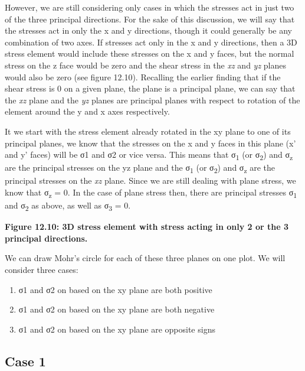 \documentclass[
  letterpaper,
  DIV=11,
  numbers=noendperiod]{scrreprt}
\begin{document}
However, we are still considering only cases in which the stresses act
in just two of the three principal directions. For the sake of this
discussion, we will say that the stresses act in only the x and y
directions, though it could generally be any combination of two axes. If
stresses act only in the x and y directions, then a 3D stress element
would include these stresses on the x and y faces, but the normal stress
on the z face would be zero and the shear stress in the \emph{xz} and
\emph{yz} planes would also be zero (see figure 12.10). Recalling the
earlier finding that if the shear stress is 0 on a given plane, the
plane is a principal plane, we can say that the \emph{xz} plane and the
\emph{yz} planes are principal planes with respect to rotation of the
element around the y and x axes respectively.

It we start with the stress element already rotated in the xy plane to
one of its principal planes, we know that the stresses on the x and y
faces in this plane (x' and y' faces) will be σ1 and σ2 or vice versa.
This means that σ\textsubscript{1} (or σ\textsubscript{2}) and
σ\textsubscript{z} are the principal stresses on the yz plane and the
σ\textsubscript{1} (or σ\textsubscript{2}) and σ\textsubscript{z} are
the principal stresses on the \emph{xz} plane. Since we are still
dealing with plane stress, we know that σ\textsubscript{z} = 0. In the
case of plane stress then, there are principal stresses
σ\textsubscript{1} and σ\textsubscript{2} as above, as well as
σ\textsubscript{3} = 0.

\textbf{Figure 12.10: 3D stress element with stress acting in only 2 or
the 3 principal directions.}

We can draw Mohr's circle for each of these three planes on one plot. We
will consider three cases:

\begin{enumerate}
\def\labelenumi{\arabic{enumi}.}
\item
  σ1 and σ2 on based on the xy plane are both positive
\item
  σ1 and σ2 on based on the xy plane are both negative
\item
  σ1 and σ2 on based on the xy plane are opposite signs
\end{enumerate}

\subsection{Case 1}\label{case-1}
\end{document}
